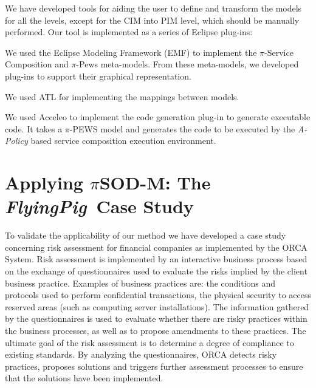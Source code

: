 \documentclass{singlecol-new}
\theoremstyle{TH}{
\newtheorem{lemma}{Lemma}
\newtheorem{theorem}[lemma]{Theorem}
\newtheorem{corrolary}[lemma]{Corrolary}
\newtheorem{conjecture}[lemma]{Conjecture}
\newtheorem{proposition}[lemma]{Proposition}
\newtheorem{claim}[lemma]{Claim}
\newtheorem{stheorem}[lemma]{Wrong Theorem}
\newtheorem{algorithm}{Algorithm}
}
\theoremstyle{THrm}{
\newtheorem{definition}{Definition}[section]
\newtheorem{question}{Question}[section]
\newtheorem{remark}{Remark}
\newtheorem{scheme}{Scheme}
}
\theoremstyle{THhit}{
\newtheorem{case}{Case}[section]
}
\theoremstyle{THhsl}{
\newtheorem{example}{Example}
}
\newcommand{\pisodm}[0]{$\pi$SOD-M\xspace}
\def\FlyingPig{\textsl{FlyingPig}\xspace}
\begin{document}
We have developed tools for aiding the user to define and transform the models for all the levels, except for the CIM into PIM level, which should be manually performed.
Our tool is implemented as a series of Eclipse plug-ins: 
\begin{compactitem}
\item 	We  used the Eclipse Modeling Framework (EMF)\footnotemark {}  to implement the  $\pi$-Service Composition and $\pi$-{\sc Pews}  meta-models. 
From these meta-models, we  developed plug-ins to support their graphical representation.

\item	 We used  ATL\footnotemark {}
for implementing the  mappings between models.

\item 	We  used Acceleo\footnotemark {} to implement  the code generation plug-in to generate executable code.
It takes a $\pi$-PEWS model and generates the code to be executed by the {\em
A-Policy} based service composition execution environment.
\end{compactitem}

\section{Applying \pisodm: The \FlyingPig\ Case Study}
\label{sec:flyingPig}


To validate the applicability of our method we have developed a case study concerning risk assessment for financial companies as implemented by the ORCA System\footnotemark {}.%
Risk assessment is implemented by an interactive business process based on the exchange of questionnaires used to evaluate the risks implied by the client business practice.
Examples of business practices are: the conditions and protocols used to perform confidential transactions, the physical security to access reserved areas (such as computing server installations).
The information gathered by the questionnaires is used to evaluate whether there are risky practices within the business processes, as well as to propose amendments to these practices.
The ultimate goal of the risk assessment is to determine a degree of compliance to existing standards.
By analyzing the questionnaires, ORCA detects risky practices, proposes solutions and triggers further assessment processes to ensure that the solutions have been implemented.
\end{document}

